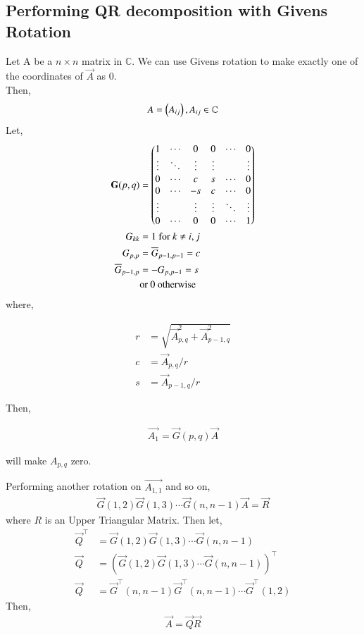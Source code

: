 \documentclass[journal]{IEEEtran}
\numberwithin{equation}{section}
\begin{document}
\subsection{Performing QR decomposition with Givens Rotation}

Let A be a $n\times n$ matrix in $\mathbb{C}$. We can use Givens rotation to make exactly one of the coordinates of $\vec{A}$ as 0.\\
Then,
\begin{align}
    A = \begin{pmatrix}A_{ij}\end{pmatrix}, A_{ij} \in \mathbb{C}\\
\end{align}
Let,
\begin{align}
    \mathbf{G}(p,q) &= \begin{pmatrix}1 & \cdots & 0 & 0 & \cdots & 0\\ \vdots & \ddots & \vdots & \vdots & & \vdots \\ 0 & \cdots & c & s & \cdots & 0\\ 0 & \cdots & -s & c & \cdots & 0\\ \vdots & & \vdots & \vdots & \ddots & \vdots \\ 0 & \cdots & 0 & 0 & \cdots & 1\end{pmatrix} \\
    G_{kk} &= 1  \text{ for } k \neq i, j\\
    G_{p,p} &= \overline{G}_{p-1,p-1} = c\\
    \overline{G}_{p-1,p} &= -G_{p,p-1} = s\\
    &\text{or 0 otherwise}
\end{align}
where,

\begin{align}
    r &= \sqrt{\vec{A}_{p,q}^2 + \vec{A}_{p-1, q}^2}\\
    c &= \vec{A}_{p,q}/r\\
    s &= \vec{A}_{p-1,q}/r
\end{align}

Then,

\begin{align}
    \vec{A_1} = \vec{G}(p, q)\vec{A}
\end{align}

will make $A_{p, q}$ zero.

Performing another rotation on $\vec{A_{1,1}}$ and so on,
\begin{align}
    \vec{G}(1,2)\vec{G}(1, 3) \cdots \vec{G}(n, n-1)\vec{A} = \vec{R}
\end{align}
where $R$ is an Upper Triangular Matrix. Then let,
\begin{align}
    \vec{Q}^\top &= \vec{G}(1,2)\vec{G}(1,3) \cdots \vec{G}(n, n-1)\\
    \vec{Q} &= {(\vec{G}(1,2)\vec{G}(1,3) \cdots \vec{G}(n, n-1))}^\top\\
    \vec{Q} &= \vec{G}^\top(n,n-1)\vec{G}^\top(n,n-1) \cdots \vec{G}^\top(1,2)
\end{align}
Then,
\begin{align}
    \vec{A} = \vec{Q}\vec{R}
\end{align}
\end{document}
